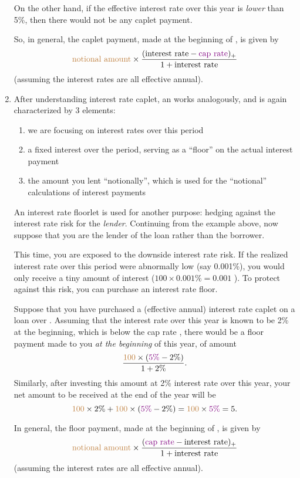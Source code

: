 \begin{enumerate}
On the other hand, if the effective interest rate over this year is
\emph{lower} than 5\%, then there would not be any caplet payment.

So, in general, the caplet payment, made at the beginning of ,
is given by
\[
{\color{brown}\text{notional amount}}\times \frac{(\text{interest rate}-{\color{violet}\text{cap rate}})_{+}}{1+\text{interest rate}}
\]
(assuming the interest rates are all effective annual).

\item After understanding interest rate caplet, an  works analogously, and is again characterized by 3 elements:
\begin{enumerate}[label={(\arabic*)}]
\item {} we are focusing on interest rates over this period
\item {} a fixed interest over the period, serving as a ``floor'' on the actual interest payment
\item {} the amount you lent ``notionally'', which is
used for the ``notional'' calculations of interest payments
\end{enumerate}
An interest rate floorlet is used for another purpose: hedging against the
interest rate risk for the \emph{lender}. Continuing from the example above,
now suppose that you are the lender of the loan rather than the borrower.

This time, you are exposed to the downside interest rate risk. If the realized
interest rate over this period were abnormally low (say 0.001\%), you would only
receive a tiny amount of interest (\(100\times 0.001\%=0.001\) \warn{}). To
protect against this risk, you can purchase an interest rate floor.

Suppose that you have purchased a  (effective annual) interest rate
caplet on a  loan over . Assuming that the interest
rate over this year is known to be 2\% at the beginning, which is below the cap
rate , there would be a floor payment made to you \emph{at the
beginning} of this year, of amount
\[
\frac{{\color{brown}100}\times ({\color{violet}5\%}-2\%)}{1+2\%}.
\]
Similarly, after investing this amount at 2\% interest rate over this year, your
net amount to be received at the end of the year will be
\[
{\color{brown}100}\times 2\%+{\color{brown}100}\times ({\color{violet}5\%}-2\%)
={\color{brown}100}\times {\color{violet}5\%}=5.
\]

In general, the floor payment, made at the beginning of , is
given by
\[
{\color{brown}\text{notional amount}}\times \frac{({\color{violet}\text{cap rate}}-\text{interest rate})_{+}}{1+\text{interest rate}}
\]
(assuming the interest rates are all effective annual).


\end{enumerate}
